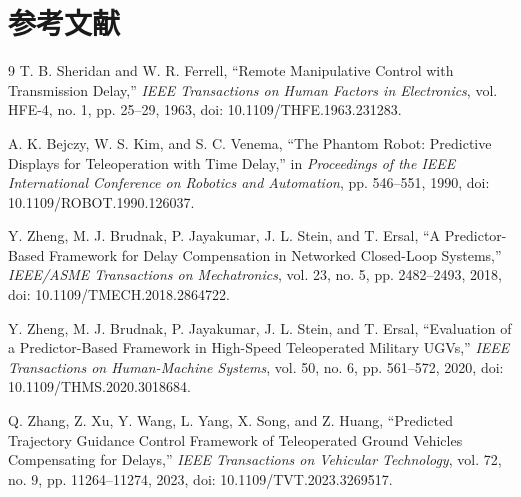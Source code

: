\documentclass[11pt,a4paper]{article}
\begin{document}
\section{参考文献}

\begin{thebibliography}{9}
\small
{}
T. B. Sheridan and W. R. Ferrell,
``Remote Manipulative Control with Transmission Delay,''
\textit{IEEE Transactions on Human Factors in Electronics},
vol. HFE-4, no. 1, pp. 25--29, 1963,
doi: 10.1109/THFE.1963.231283.

A. K. Bejczy, W. S. Kim, and S. C. Venema,
``The Phantom Robot: Predictive Displays for Teleoperation with Time Delay,''
in \textit{Proceedings of the IEEE International Conference on Robotics and Automation},
pp. 546--551, 1990,
doi: 10.1109/ROBOT.1990.126037.

Y. Zheng, M. J. Brudnak, P. Jayakumar, J. L. Stein, and T. Ersal,
``A Predictor-Based Framework for Delay Compensation in Networked Closed-Loop Systems,''
\textit{IEEE/ASME Transactions on Mechatronics},
vol. 23, no. 5, pp. 2482--2493, 2018,
doi: 10.1109/TMECH.2018.2864722.

Y. Zheng, M. J. Brudnak, P. Jayakumar, J. L. Stein, and T. Ersal,
``Evaluation of a Predictor-Based Framework in High-Speed Teleoperated Military UGVs,''
\textit{IEEE Transactions on Human-Machine Systems},
vol. 50, no. 6, pp. 561--572, 2020,
doi: 10.1109/THMS.2020.3018684.

Q. Zhang, Z. Xu, Y. Wang, L. Yang, X. Song, and Z. Huang,
``Predicted Trajectory Guidance Control Framework of Teleoperated Ground Vehicles Compensating for Delays,''
\textit{IEEE Transactions on Vehicular Technology},
vol. 72, no. 9, pp. 11264--11274, 2023,
doi: 10.1109/TVT.2023.3269517.
\end{thebibliography}
\end{document}
